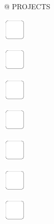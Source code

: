 \documentclass[11pt,titlepage]{article}
\begin{document}
\small %
\noindent \hspace{-4mm} @ \hfill PROJECTS

\vspace{6mm}

\noindent
\includegraphics[]{checkbox-6mm.pdf}

\vspace{12mm}

\noindent
\includegraphics[]{checkbox-6mm.pdf}

\vspace{12mm}

\noindent
\includegraphics[]{checkbox-6mm.pdf}

\vspace{12mm}

\noindent
\includegraphics[]{checkbox-6mm.pdf}

\vspace{12mm}

\noindent
\includegraphics[]{checkbox-6mm.pdf}

\vspace{12mm}

\noindent
\includegraphics[]{checkbox-6mm.pdf}

\vspace{12mm}

\noindent
\includegraphics[]{checkbox-6mm.pdf}
\end{document}
